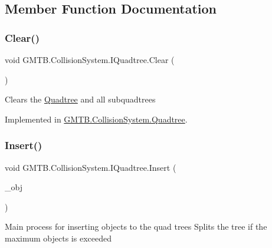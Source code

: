 \subsection{Member Function Documentation}
\mbox{\label{interface_g_m_t_b_1_1_collision_system_1_1_i_quadtree_a1c8e400a9e317fe0152b81e567823443}} 
\subsubsection{\texorpdfstring{Clear()}{Clear()}}
{\footnotesize\ttfamily void G\+M\+T\+B.\+Collision\+System.\+I\+Quadtree.\+Clear (\begin{DoxyParamCaption}{ }\end{DoxyParamCaption})}



Clears the \mbox{\hyperlink{class_g_m_t_b_1_1_collision_system_1_1_quadtree}{Quadtree}} and all subquadtrees 



Implemented in \mbox{\hyperlink{class_g_m_t_b_1_1_collision_system_1_1_quadtree_a7bfe7e80821c425da16ba1bcabfac9ac}{G\+M\+T\+B.\+Collision\+System.\+Quadtree}}.

\mbox{\label{interface_g_m_t_b_1_1_collision_system_1_1_i_quadtree_a22a84d4c7495fdb318cdd1d359c3591b}} 
\subsubsection{\texorpdfstring{Insert()}{Insert()}}
{\footnotesize\ttfamily void G\+M\+T\+B.\+Collision\+System.\+I\+Quadtree.\+Insert (\begin{DoxyParamCaption}\item[{\mbox{\hyperlink{interface_g_m_t_b_1_1_collision_system_1_1_i_collidable}{I\+Collidable}}}]{\+\_\+obj }\end{DoxyParamCaption})}



Main process for inserting objects to the quad trees Splits the tree if the maximum objects is exceeded 


